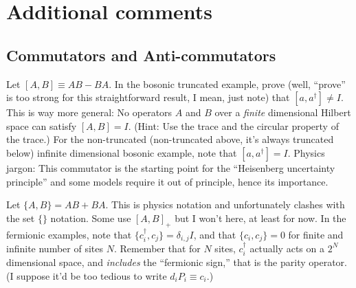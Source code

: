 
%

 	 \section{Additional comments}
 	 \subsection{Commutators and Anti-commutators}
 	 Let $[A, B] \equiv AB - BA$.
 	 In the bosonic truncated example, prove (well, ``prove'' is too strong for this straightforward result, I mean, just note)
 	 that $[a, a^\dagger] \neq I$. This is way more general: No operators $A$ and $B$ over a \emph{finite} dimensional
 	 Hilbert space can satisfy $[A, B] = I$. (Hint: Use the trace and the circular property of the trace.)
 	 For the non-truncated (non-truncated above, it's always truncated below) infinite dimensional bosonic example,
 	 note that $[a, a^\dagger] = I$.
 	 Physics jargon: This commutator is the
 	 starting point for the  ``Heisenberg uncertainty principle'' and some models require it out of principle, hence its importance.
 
 	 Let $\{A, B\}=AB + BA$. This is physics notation and unfortunately clashes with the set $\{\}$ notation. Some use $[A, B]_+$ but I won't here,
 	 at least for now.
 	 In the fermionic examples, note that $\{c^\dagger_i, c_j\} = \delta_{i,j}I$,
 	 and that $\{c_i, c_j\} = 0$ for finite and infinite number of sites $N$.
 	 Remember that for $N$ sites, $c^\dagger_i$ actually acts on a $2^N$ dimensional space, and \emph{includes} the ``fermionic sign,'' that is the parity
 	 operator.  (I suppose it'd be too tedious to write $d_iP_i\equiv c_i$.)
 
